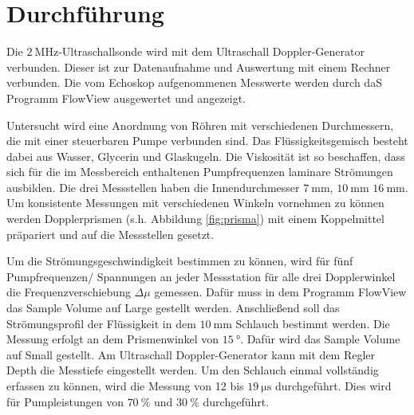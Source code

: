 \section{Durchführung}
\label{sec:Durchführung}

Die $\SI{2}{\mega\hertz}$-Ultraschallsonde wird mit dem Ultraschall Doppler-Generator verbunden.
Dieser ist zur Datenaufnahme und Auswertung mit einem Rechner verbunden.
Die vom Echoskop aufgenommenen Messwerte werden durch daS Programm FlowView ausgewertet und angezeigt.

Untersucht wird eine Anordnung von Röhren mit verschiedenen Durchmessern, die mit einer steuerbaren Pumpe verbunden sind.
Das Flüssigkeitsgemisch besteht dabei aus Wasser, Glycerin und Glaskugeln.
Die Viskosität ist so beschaffen, dass sich für die im Messbereich enthaltenen Pumpfrequenzen laminare Strömungen ausbilden.
Die drei Messstellen haben die Innendurchmesser $\SI{7}{\milli\metre}$, $\SI{10}{\milli\metre}$ $\SI{16}{\milli\metre}$.
Um konsistente Messungen mit verschiedenen Winkeln vornehmen zu können werden Dopplerprismen (s.h. Abbildung \ref{fig:prisma}) mit einem Koppelmittel präpariert und auf die Messstellen gesetzt.

Um die Strömungsgeschwindigkeit bestimmen zu können, wird für fünf Pumpfrequenzen/ Spannungen an jeder Messstation für alle drei Dopplerwinkel die Frequenzverschiebung $\Delta \mu$ gemessen.
Dafür muss in dem Programm FlowView das Sample Volume auf Large gestellt werden.
Anschließend soll das Strömungsprofil der Flüssigkeit in dem $\SI{10}{\milli\metre}$ Schlauch bestimmt werden.
Die Messung erfolgt an dem Prismenwinkel von $\SI{15}{\degree}$.
Dafür wird das Sample Volume auf Small gestellt.
Am Ultraschall Doppler-Generator kann mit dem Regler Depth die Messtiefe eingestellt werden.
Um den Schlauch einmal vollständig erfassen zu können, wird die Messung von 12 bis $\SI{19}{\micro\second}$ durchgeführt.
Dies wird für Pumpleistungen von $\SI{70}{\percent}$ und $\SI{30}{\percent}$ durchgeführt.
